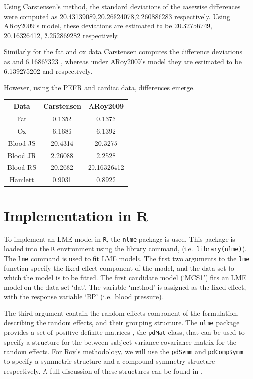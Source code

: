 \documentclass[12pt, a4paper]{report}
\theoremstyle{plain}
\theoremstyle{definition}
\theoremstyle{remark}
\begin{document}
	Using Carstensen's method, the standard deviations of the casewise
	differences were computed as 20.43139089,20.26824078,2.260886283
	respectively. Using ARoy2009's model, these deviations are estimated to
	be 20.32756749, 20.16326412, 2.252869282 respectively.
	
	Similarly for the fat and ox data Carstensen computes the
	difference deviations as and 6.16867323 , whereas under
	ARoy2009's model they are estimated to be 6.139275202 and
	respectively.
	
	However, using the PEFR and cardiac data, differences emerge.
	
	\begin{tabular}{|c|c|c|}
		\hline
		Data & Carstensen & ARoy2009 \\
		\hline
		Fat &  0.1352 & 0.1373\\
		Ox & 6.1686 & 6.1392 \\
		Blood JS & 20.4314 & 20.3275
		\\
		Blood JR & 2.26088 & 2.2528
		\\
		Blood RS & 20.2682 & 20.16326412
		\\
		Hamlett & 0.9031 & 0.8922
		
		\\
		\hline
	\end{tabular}
	
\newpage	
	
\section{Implementation in R}
To implement an LME model in \texttt{R}, the \texttt{nlme} package is used. This package is loaded into the \texttt{R} environment using the library command, (i.e.\ \texttt{library(nlme)}). The \texttt{lme} command is used to fit LME models. The first two arguments to the \texttt{lme} function specify the fixed effect component of the model, and the data set to which the model is to be fitted. The first candidate model (`MCS1') fits an LME model on the data set `dat'. The variable `method' is assigned as the fixed effect, with the response variable `BP' (i.e.\ blood pressure).

The third argument contain the random effects component of the formulation, describing the random effects, and their grouping structure. The \texttt{nlme} package provides a set of positive-definite matrices , the \texttt{pdMat} class, that can be used to specify a structure for the between-subject variance-covariance matrix for the random effects. For Roy's methodology, we will use the \texttt{pdSymm} and \texttt{pdCompSymm} to specify a symmetric structure and a compound symmetry structure respectively. A full discussion of these structures can be found in \citet[pg. 158]{PB}.
\end{document}
